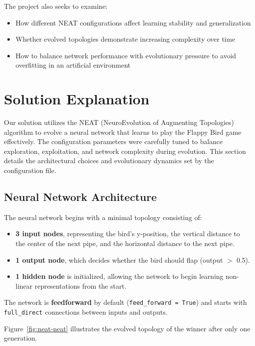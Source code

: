\documentclass[sigconf]{acmart}
\begin{document}
The project also seeks to examine:
\begin{itemize}
  \item How different NEAT configurations affect learning stability and generalization
  \item Whether evolved topologies demonstrate increasing complexity over time
  \item How to balance network performance with evolutionary pressure to avoid overfitting in an artificial environment
\end{itemize}

\section{Solution Explanation}

Our solution utilizes the NEAT (NeuroEvolution of Augmenting Topologies) algorithm to evolve a neural network that learns to play the Flappy Bird game effectively. The configuration parameters were carefully tuned to balance exploration, exploitation, and network complexity during evolution. This section details the architectural choices and evolutionary dynamics set by the configuration file.

\subsection{Neural Network Architecture}
The neural network begins with a minimal topology consisting of:
\begin{itemize}
  \item \textbf{3 input nodes}, representing the bird's y-position, the vertical distance to the center of the next pipe, and the horizontal distance to the next pipe.
  \item \textbf{1 output node}, which decides whether the bird should flap (output $>$ 0.5).
  \item \textbf{1 hidden node} is initialized, allowing the network to begin learning non-linear representations from the start.
\end{itemize}
The network is \textbf{feedforward} by default (\texttt{feed\_forward = True}) and starts with \texttt{full\_direct} connections between inputs and outputs.

Figure~\ref{fig:neat-neat} illustrates the evolved topology of the winner after only one generation.
\end{document}

